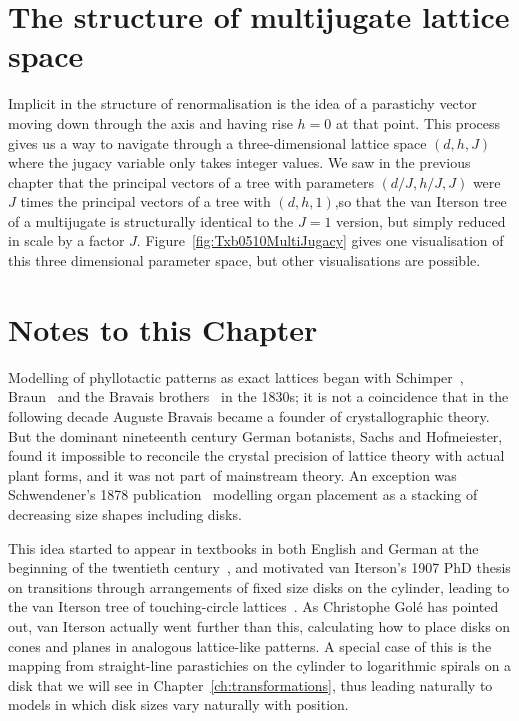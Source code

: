 \section{The structure of multijugate lattice space}
\label{sec:Jlattice}
Implicit in the structure of renormalisation is the idea of a parastichy vector moving down through the axis and having rise $h=0$ at that point. This process gives us a way to navigate through a three-dimensional lattice space $(d,h,J)$ where the jugacy variable only takes integer values. We saw in the previous chapter that the principal vectors of a tree with parameters $(d/J,h/J,J)$ were $J$ times the principal vectors of a tree with $(d,h,1)$,so that the van Iterson tree of a multijugate is structurally identical to the $J=1$ version, but simply reduced in scale by a factor $J$.  Figure~\ref{fig:Txb0510MultiJugacy} gives one visualisation of this three dimensional parameter space, but other visualisations are possible. 

\section{Notes to this Chapter}%

Modelling of phyllotactic patterns as exact lattices began with Schimper~\cite{schimperBeschreibungSymphytumZeyheri1835}, Braun~\cite{braunBetrachtungenUeberErscheinung1851} and the Bravais brothers~\cite{bravaisEssaiDispositionFeuilles1837} in the 1830s; it is not a coincidence that in the following decade Auguste Bravais became a founder of crystallographic theory. But the dominant nineteenth century German botanists, Sachs and Hofmeiester, found it impossible to reconcile the crystal precision of lattice theory with actual plant forms, and it was not part of mainstream theory. An exception was Schwendener's 1878 publication~\cite{schwendenerMechanischeTheorieBlattstellungen1878} modelling organ placement as a stacking of decreasing size shapes including disks.

This idea started to appear in textbooks in both English and German at the beginning of the twentieth century~\cite{weisseSketchMechanicalHypothesis1900}, and motivated van Iterson's 1907 PhD thesis on transitions through arrangements of fixed size disks on the cylinder, leading to the van Iterson tree of touching-circle lattices~\cite{vanitersonjrMathematischeUndMikroscopischAnatomische1907}. 
As Christophe Golé has pointed out, van Iterson actually went further than this, calculating how to place disks on cones and planes in analogous lattice-like patterns. A special case of this is the mapping from straight-line parastichies on the cylinder to logarithmic spirals on a disk that we will see in Chapter~\ref{ch:transformations}, thus leading naturally to models in which disk sizes vary naturally with position. 



